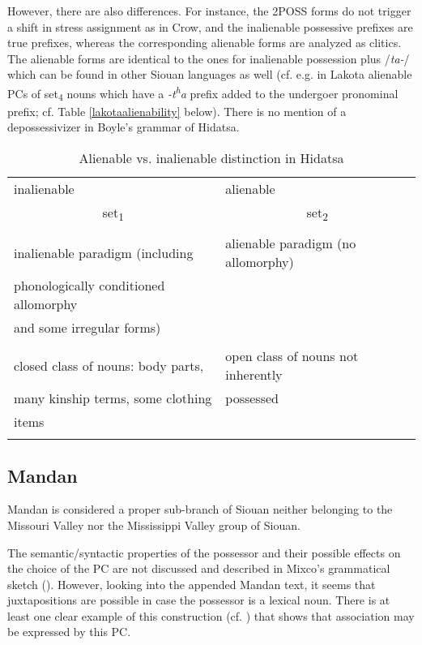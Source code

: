 \documentclass[output=paper]{LSP/langsci}
\begin{document}
However, there are also differences. For instance, the 2POSS forms do not trigger a shift in stress assignment as in Crow, and the inalienable possessive prefixes are true prefixes, whereas the corresponding alienable forms are analyzed as clitics.  The alienable forms are identical to the ones for inalienable possession plus /\textit{ta-}/ which can be found in other Siouan languages as well (cf. e.g. in Lakota alienable PCs of set\textsubscript{4} nouns which have a \textit{-t\textsuperscript{h}a} prefix added to the undergoer pronominal prefix; cf. Table \ref{lakotaalienability} below). There is no mention of a depossessivizer in Boyle's grammar of Hidatsa.

\begin{table}
\caption{Alienable vs. inalienable distinction in Hidatsa} \label{hidatsaalienability}
\begin{tabular}{ l l }
\lsptoprule
inalienable & alienable \\
 \multicolumn{1}{c}{set\textsubscript{1}} &  \multicolumn{1}{c}{set\textsubscript{2}} \\
\midrule
&\\
inalienable paradigm (including & alienable paradigm (no allomorphy) \\
phonologically conditioned allomorphy & \\
and some irregular forms) & \\
 & \\
 closed class of nouns: body parts, & open class of nouns not inherently \\
many kinship terms, some clothing &  possessed \\
items & \\
\lspbottomrule
\end{tabular}
\end{table}

\subsection{Mandan}
Mandan is considered a proper sub-branch of Siouan neither belonging to the Missouri Valley nor the Mississippi Valley group of Siouan. 

The semantic/syntactic properties of the possessor and their possible effects on the choice of the PC are not discussed and described in Mixco's grammatical sketch (\citealt{Mixco1997}). However, looking into the appended Mandan text, it seems that juxtapositions are possible in case  the possessor is a lexical noun. There is at least one clear example of this construction (cf. ) that shows that association may be expressed by this PC.
\end{document}

